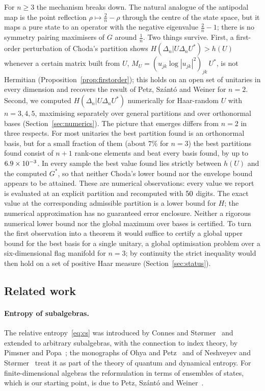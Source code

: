 \documentclass[11pt]{article}
\theoremstyle{plain}
\theoremstyle{definition}
\theoremstyle{remark}
\begin{document}
For $n\ge3$ the mechanism breaks down. The natural analogue of the antipodal map is the point reflection
$\rho\mapsto\frac2n-\rho$ through the centre of the state space, but it maps a pure state to an operator with the negative
eigenvalue $\frac2n-1$; there is no symmetry pairing maximisers of $G$ around $\frac1n$. Two things survive. First, a
first-order perturbation of Choda's partition shows $H(\Delta_n|U\Delta_nU^*)>h(U)$ whenever a certain matrix built from
$U$, $M_U=(u_{jk}\log|u_{jk}|^2)_{jk}\,U^*$, is not Hermitian (Proposition~\ref{prop:firstorder}); this holds on an open
set of unitaries in every dimension and recovers the result of Petz, Sz\'ant\'o and Weiner for $n=2$. Second, we
computed $H(\Delta_n|U\Delta_nU^*)$ numerically for Haar-random $U$ with $n=3,4,5$, maximising separately over general
partitions and over orthonormal bases (Section~\ref{sec:numerics}). The picture that emerges differs from $n=2$ in three
respects. For most unitaries the best partition found is an orthonormal basis, but for a small fraction of them (about
$7\%$ for $n=3$) the best partitions found consist of $n+1$ rank-one elements and beat every basis found, by up to
$6.9\times10^{-3}$. In every sample the best value found lies strictly between $h(U)$ and the computed $G^*$, so that
neither Choda's lower bound nor the envelope bound appears to be attained. These are numerical observations: every value
we report is evaluated at an explicit partition and recomputed with $50$ digits. The exact value at the
corresponding admissible partition is a lower bound for $H$; the numerical approximation has no guaranteed error
enclosure. Neither a rigorous numerical lower bound nor the global maximum over bases is certified. To turn the first observation into a theorem it
would suffice to certify a global upper bound for the best basis for a single unitary, a global optimisation problem over
a six-dimensional flag manifold for $n=3$; by continuity the strict inequality would then hold on a set of positive Haar
measure (Section~\ref{sec:status}).

\subsection{Related work}\label{sec:lit}

\paragraph{Entropy of subalgebras.} The relative entropy~\eqref{eq:cs} was introduced by Connes and
St{\o}rmer~\cite{connes1975} and extended to arbitrary subalgebras, with the connection to index theory, by Pimsner and
Popa~\cite{pimsner1986}; the monographs of Ohya and Petz~\cite{ohya1993} and of Neshveyev and St{\o}rmer~\cite{neshveyev2006}
treat it as part of the theory of quantum and dynamical entropy. For finite-dimensional algebras the reformulation in
terms of ensembles of states, which is our starting point, is due to Petz, Sz\'ant\'o and Weiner~\cite{petz2009}.
\end{document}
